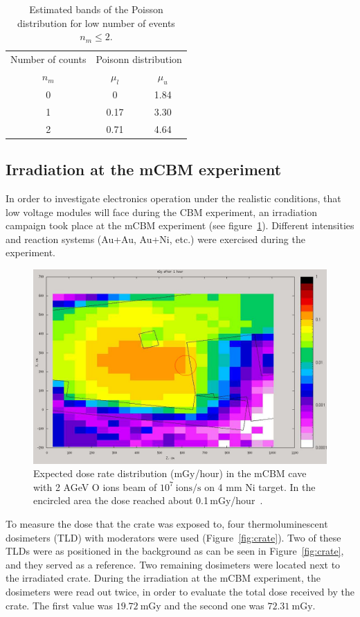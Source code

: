 \begin{table}[!h]
\centering
\caption{Estimated bands of the Poisson distribution for low number of events $n_{m}  \leq 2$.}
\begin{tabular}{ccc}
\hline
Number of counts & \multicolumn{2}{c}{Poisonn distribution} \\ \cline{2-3} 
$n_{m}$          & $\mu_{l}$            & $\mu_{u}$           \\ \hline
0                & 0                    & 1.84                \\
1                & 0.17                & 3.30                \\
2                & 0.71                & 4.64                \\ \hline
\end{tabular}
\end{table}
\subsection{Irradiation at the mCBM experiment}
In order to investigate electronics operation under the realistic conditions, that low voltage modules will face during the CBM experiment, an irradiation campaign took place at the \gls{mCBM} experiment (see figure~\ref{fig:CBM1}). Different intensities and reaction systems (Au+Au, Au+Ni, etc.) were exercised during the experiment.
\begin{figure}[!h]
    \centering
    \includegraphics[width=0.65\columnwidth]{Chapter4/images/dose1.jpg}
    \caption{Expected dose rate distribution (mGy/hour) in the \gls{mCBM} cave with 2 AGeV O ions beam of $10^{7}\mathrm{\ ions/s}$ on 4 mm Ni target. In the encircled area the dose reached about 0.1\,mGy/hour~\cite{fluka_senger}.}
     \label{fig:CBM1}
\end{figure}


To measure the dose that the crate was exposed to, four thermoluminescent dosimeters (\gls{TLD}) with moderators were used (Figure~\ref{fig:crate}). Two of these TLDs were as positioned in the background as can be seen in Figure~\ref{fig:crate}, and they served as a reference. Two remaining dosimeters were located next to the irradiated crate. During the irradiation at the \gls{mCBM} experiment, the dosimeters were read out twice, in order to evaluate the total dose received by the crate. The first value was $19.72\mathrm{\ mGy}$ and  the second one was $72.31\mathrm{\ mGy}$. 


